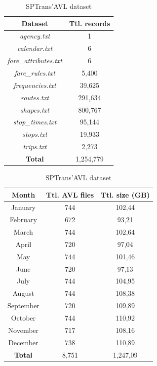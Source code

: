 \documentclass[runningheads]{llncs}
\begin{document}
\begin{table}[!htb]
    \begin{minipage}[t]{.45\linewidth}
      \caption{Dataset and total records specified in SPTrans' GTFS}
      \centering
      \label {tab:gtfs}
\begin {tabular} {c | c}
\toprule
\textbf{Dataset} & \textbf {Ttl. records} \\
\midrule
\textit{agency.txt} & 1 \\
\hline
\textit{calendar.txt} & 6 \\
\hline
\textit{fare\_attributes.txt} & 6 \\
\hline
\textit{fare\_rules.txt} & 5,400 \\
\hline
\textit{frequencies.txt} & 39,625 \\
\hline
\textit{routes.txt} & 291,634 \\
\hline
\textit{shapes.txt} & 800,767 \\
\hline
\textit{stop\_times.txt} & 95,144 \\
\hline
\textit{stops.txt} & 19,933 \\
\hline
\textit{trips.txt} & 2,273 \\
\midrule
\textbf{Total} & 1,254,779 \\
\bottomrule
\end {tabular}
\end{minipage}%
\quad
    \begin{minipage}[t]{.45\linewidth}
      \centering
        \caption{SPTrans'AVL dataset}
        \label{tab:avlDataset}
\begin{tabular}{ c | c | c}
\toprule
\textbf{Month} & \textbf{Ttl. AVL files} & \textbf{Ttl. size (GB)}\\
\midrule
January & 744 & 102,44 \\
\hline
 February & 672 & 93,21 \\
\hline
 March & 744 & 102,64 \\
\hline
 April & 720 & 97,04 \\
\hline
 May & 744 & 101,46 \\
\hline
 June & 720 & 97,13 \\
\hline
 July & 744 & 104,95 \\
\hline
 August &  744 & 108,38 \\
\hline
 September & 720 & 109,89 \\
\hline
 October & 744 & 110,92 \\
\hline
 November & 717 & 108,16 \\
\hline
 December & 738 & 110,89 \\
\midrule
\textbf{Total} & 8,751 & 1,247,09 \\
\bottomrule
\end{tabular}
    \end{minipage} 
\end{table}
\end{document}
